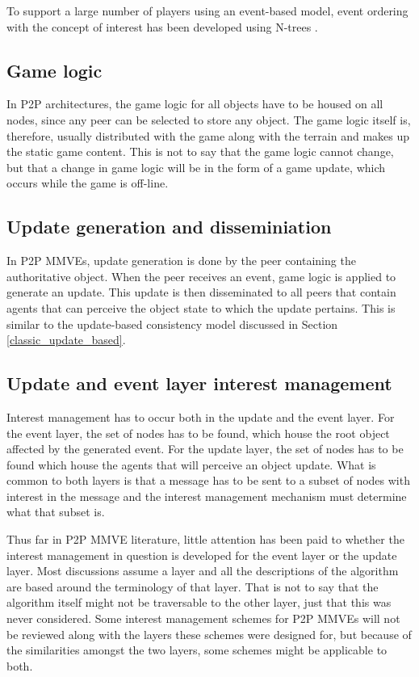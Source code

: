 To support a large number of players using an event-based model, event ordering with the concept of interest has been developed using N-trees \cite{GauthierDickey_ntrees}.

\subsection{Game logic}

In P2P architectures, the game logic for all objects have to be housed on all nodes, since any peer can be selected to store any object. The game logic itself is, therefore, usually distributed with the game along with the terrain and makes up the static game content. This is not to say that the game logic cannot change, but that a change in game logic will be in the form of a game update, which occurs while the game is off-line.

\subsection{Update generation and disseminiation}

In P2P MMVEs, update generation is done by the peer containing the authoritative object. When the peer receives an event, game logic is applied to generate an update. This update is then disseminated to all peers that contain agents that can perceive the object state to which the update pertains. This is similar to the update-based consistency model discussed in Section \ref{classic_update_based}.

\subsection{Update and event layer interest management}
\label{key_challenges_im}

Interest management has to occur both in the update and the event layer. For the event layer, the set of nodes has to be found, which house the root object affected by the generated event. For the update layer, the set of nodes has to be found which house the agents that will perceive an object update. What is common to both layers is that a message has to be sent to a subset of nodes with interest in the message and the interest management mechanism must determine what that subset is.

Thus far in P2P MMVE literature, little attention has been paid to whether the interest management in question is developed for the event layer or the update layer. Most discussions assume a layer and all the descriptions of the algorithm are based around the terminology of that layer. That is not to say that the algorithm itself might not be traversable to the other layer, just that this was never considered. Some interest management schemes for P2P MMVEs will not be reviewed along with the layers these schemes were designed for, but because of the similarities amongst the two layers, some schemes might be applicable to both.

